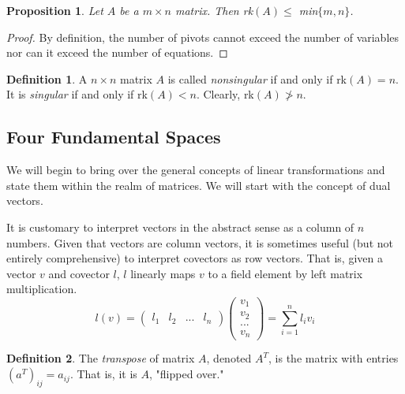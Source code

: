 \documentclass{article}
\newtheorem{proposition}[theorem]{Proposition}
\theoremstyle{remark}
\theoremstyle{definition}
\newtheorem{definition}{Definition}[section]
\begin{document}
\begin{proposition}
Let $A$ be a $m \times n$ matrix. Then rk$(A) \leq$ min$\{m ,n\}$. 
\end{proposition}
\begin{proof}
By definition, the number of pivots cannot exceed the number of variables nor can it exceed the number of equations. 
\end{proof}

\begin{definition}
A $n \times n$ matrix $A$ is called \textit{nonsingular} if and only if rk$(A) = n$. It is \textit{singular} if and only if rk$(A) < n$. Clearly, rk$(A) \not> n$. 
\end{definition}

\subsection{Four Fundamental Spaces}
We will begin to bring over the general concepts of linear transformations and state them within the realm of matrices. We will start with the concept of dual vectors. 

It is customary to interpret vectors in the abstract sense as a column of $n$ numbers. Given that vectors are column vectors, it is sometimes useful (but not entirely comprehensive) to interpret covectors as row vectors. That is, given a vector $v$ and covector $l$, $l$ linearly maps $v$ to a field element by left matrix multiplication. 
\[ l(v) = \begin{pmatrix} l_1 & l_2 & ... & l_n \end{pmatrix} \begin{pmatrix}
v_1 \\ v_2 \\ ... \\ v_n
\end{pmatrix} = \sum_{i = 1}^{n} l_i v_i\]

\begin{definition}
The \textit{transpose} of matrix $A$, denoted $A^T$, is the matrix with entries $(a^T)_{i j} = a_{i j}$. That is, it is $A$, "flipped over." 
\end{definition}
\end{document}
